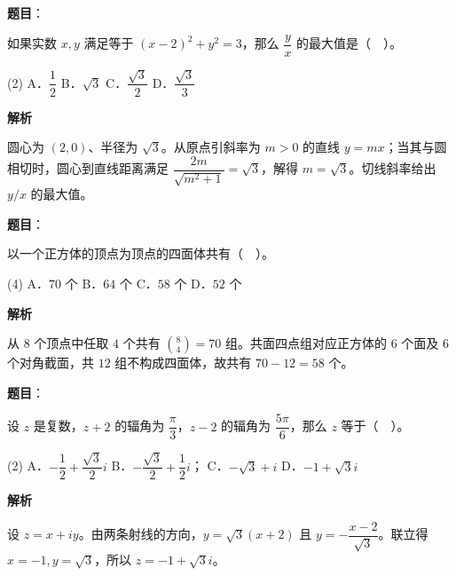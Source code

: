\begin{answer}

\textbf{题目}：

如果实数 $x,y$ 满足等于 $(x-2)^2+y^2=3$，那么 $\dfrac yx$ 的最大值是（　）。

\begin{gkopts}(2)
\task A．$\dfrac12$
\task B．$\sqrt3$
\task C．$\dfrac{\sqrt3}2$
\task D．$\dfrac{\sqrt3}3$
\end{gkopts}

\textbf{解析}

圆心为 $(2,0)$、半径为 $\sqrt3$。从原点引斜率为 $m>0$ 的直线 $y=mx$；当其与圆相切时，圆心到直线距离满足 $\dfrac{2m}{\sqrt{m^2+1}}=\sqrt3$，解得 $m=\sqrt3$。切线斜率给出 $y/x$ 的最大值。


\end{answer}
\begin{answer}

\textbf{题目}：

以一个正方体的顶点为顶点的四面体共有（　）。

\begin{gkopts}(4)
\task A．$70$ 个
\task B．$64$ 个
\task C．$58$ 个
\task D．$52$ 个
\end{gkopts}

\textbf{解析}

从 $8$ 个顶点中任取 $4$ 个共有 $\binom84=70$ 组。共面四点组对应正方体的 $6$ 个面及 $6$ 个对角截面，共 $12$ 组不构成四面体，故共有 $70-12=58$ 个。


\end{answer}
\begin{answer}

\textbf{题目}：

设 $z$ 是复数，$z+2$ 的辐角为 $\dfrac\pi3$，$z-2$ 的辐角为 $\dfrac{5\pi}6$，那么 $z$ 等于（　）。

\begin{gkopts}(2)
\task A．$-\dfrac12+\dfrac{\sqrt3}2i$
\task B．$-\dfrac{\sqrt3}2+\dfrac12i$；
\task C．$-\sqrt3+i$
\task D．$-1+\sqrt3i$
\end{gkopts}

\textbf{解析}

设 $z=x+iy$。由两条射线的方向，$y=\sqrt3(x+2)$ 且 $y=-\dfrac{x-2}{\sqrt3}$。联立得 $x=-1,y=\sqrt3$，所以 $z=-1+\sqrt3i$。


\end{answer}
